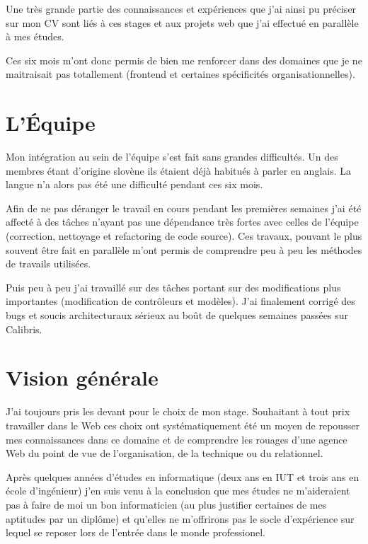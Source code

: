 \documentclass[12pt,a4paper]{book}
\begin{document}
Une très grande partie des connaissances et expériences que j'ai ainsi pu préciser sur mon CV sont liés à ces stages et aux projets web que j'ai effectué en parallèle à mes études.

Ces six mois m'ont donc permis de bien me renforcer dans des domaines que je ne maitraisait pas totallement (frontend et certaines spécificités organisationnelles).

\section{L'Équipe}

Mon intégration au sein de l'équipe s'est fait sans grandes difficultés. Un des membres étant d'origine slovène ils étaient déjà habitués à parler en anglais. La langue n'a alors pas été une difficulté pendant ces six mois.

Afin de ne pas déranger le travail en cours pendant les premières semaines j'ai été affecté à des tâches n'ayant pas une dépendance très fortes avec celles de l'équipe (correction, nettoyage et refactoring de code source). Ces travaux, pouvant le plus souvent être fait en parallèle m'ont permis de comprendre peu à peu les méthodes de travails utilisées.

Puis peu à peu j'ai travaillé sur des tâches portant sur des modifications plus importantes (modification de contrôleurs et modèles). J'ai finalement corrigé des bugs et soucis architecturaux sérieux au boût de quelques semaines passées sur Calibris.

\section{Vision générale}

J'ai toujours pris les devant pour le choix de mon stage. Souhaitant à tout prix travailler dans le Web ces choix ont systématiquement été un moyen de repousser mes connaissances dans ce domaine et de comprendre les rouages d'une agence Web du point de vue de l'organisation, de la technique ou du relationnel.

Après quelques années d'études en informatique (deux ans en IUT et trois ans en école d'ingénieur) j'en suis venu à la conclusion que mes études ne m'aideraient pas à faire de moi un bon informaticien (au plus justifier certaines de mes aptitudes par un diplôme) et qu'elles ne m'offrirons pas le socle d'expérience sur lequel se reposer lors de l'entrée dans le monde professionel.
\end{document}
